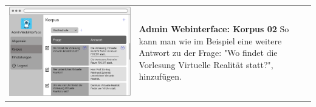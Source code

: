 \begin{tabular}{C{6cm}  L{7cm}}
    \includegraphics[width=\linewidth]{bilder/new vers. UI Design/Korpus/Admin Interface 02.png} & \textbf{Admin Webinterface: Korpus 02} \newline 
    So kann man wie im Beispiel eine weitere Antwort zu der Frage: "Wo findet die Vorlesung Virtuelle
    Realität statt?", hinzufügen.
\end{tabular}

